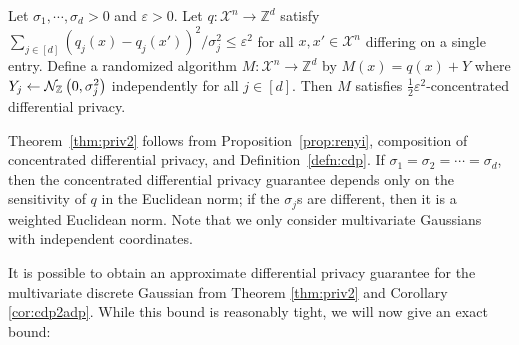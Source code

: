 \documentclass{jpc}
\newcommand{\dgausss}[2]{{\discN\left(#1,#2\right)}}
\newcommand{\dgauss}[1]{\dgausss{0}{#1}}
\newcommand{\eps}{\varepsilon}
\newcommand{\Z}{\mathbb{Z}}
\begin{document}
\begin{thm}\label{thm:priv2}
Let $\sigma_1, \cdots, \sigma_d >0$ and $\eps > 0$.
Let $q\colon \mathcal{X}^n \to \Z^d$ satisfy $\sum_{j \in [d]} (q_j(x)-q_j(x'))^2/\sigma_j^2\le\eps^2$ for all $x,x'\in\mathcal{X}^n$ differing on a single entry. Define a randomized algorithm $M\colon \mathcal{X}^n \to \Z^d$ by $M(x)=q(x)+Y$ where $Y_j \gets \dgauss{\sigma_j^2}$ independently for all $j \in [d]$. Then $M$ satisfies $\frac12 \eps^2$-concentrated differential privacy.
\end{thm}
\noindent Theorem~\ref{thm:priv2} follows from Proposition~\ref{prop:renyi}, composition of concentrated differential privacy, and Definition~\ref{defn:cdp}. If $\sigma_1 = \sigma_2 = \cdots = \sigma_d$, then the concentrated differential privacy guarantee depends only on the sensitivity of $q$ in the Euclidean norm; if the $\sigma_j$s are different, then it is a weighted Euclidean norm. Note that we only consider multivariate Gaussians with independent coordinates.

It is possible to obtain an approximate differential privacy guarantee for the multivariate discrete Gaussian from Theorem \ref{thm:priv2} and Corollary \ref{cor:cdp2adp}. While this bound is reasonably tight, we will now give an exact bound:
\end{document}

